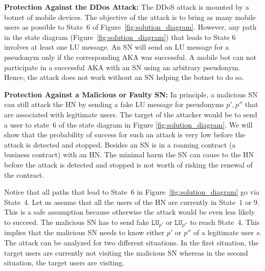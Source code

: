 \documentclass{llncs} %
\begin{document}
\textbf{Protection Against the DDos Attack:} The DDoS attack is mounted by a botnet of mobile devices. The objective of the attack is to bring as many mobile users as possible to State~$6$ of Figure~\ref{fig:solution_diagram}. However, any path in the state diagram (Figure~\ref{fig:solution_diagram}) that leads to State $6$ involves at least one LU message. An SN will send an LU message for a pseudonym only if the corresponding AKA was successful. A mobile bot can not participate in a successful AKA with an SN using an arbitrary pseudonym. Hence, the attack does not work without an SN helping the botnet to do so.


\textbf{Protection Against a Malicious or Faulty SN:} In principle, a malicious SN can still attack the HN by sending a fake LU message for pseudonyms $p',p''$ that are associated with legitimate users. The target of the attacker would be to send a user to state~$6$ of the state diagram in Figure \ref{fig:solution_diagram}. We will show that the probability of success for such an attack is very low before the attack is detected and stopped. Besides an SN is in a roaming contract (a business contract) with an HN. The minimal harm the SN can cause to the HN before the attack is detected and stopped is not worth of risking the renewal of the contract.

Notice that all paths that lead to State~$6$ in Figure~\ref{fig:solution_diagram} go via State~$4$. Let us assume that all the users of the HN are currently in State~$1$ or $9$. This is a safe assumption because otherwise the attack would be even less likely to succeed. The malicious SN has to send fake $\texttt{LU}_{p'}$ or $\texttt{LU}_{p''}$ to reach State~$4$. This implies that the malicious SN needs to know either $p'$ or $p''$ of a legitimate user $s$. The attack can be analyzed for two different situations. In the first situation, the target users are currently not visiting the malicious SN whereas in the second situation, the target users are visiting.
\end{document}
